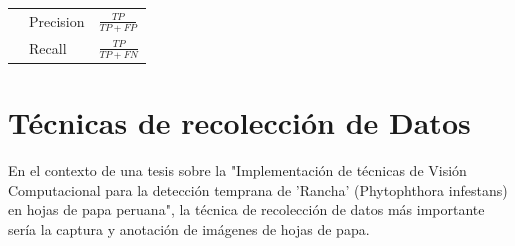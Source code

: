 \begin{table}[H]
\begin{tabular}{lll}
		\multicolumn{1}{|l|}{}                                                                                                                                                                                                                            & \multicolumn{1}{l|}{Precision}                                                                                 & \multicolumn{1}{l|}{\(\frac{TP}{TP + FP}\)}                                                                                       \\ \cline{2-3} 
		\multicolumn{1}{|l|}{}                                                                                                                                                                                                                            & \multicolumn{1}{l|}{\multirow{3}{*}{Recall}}                                                                   & \multicolumn{1}{l|}{\multirow{3}{*}{\(\frac{TP}{TP + FN}\)}}                                                                      \\
		\multicolumn{1}{|l|}{}                                                                                                                                                                                                                            & \multicolumn{1}{l|}{}                                                                                          & \multicolumn{1}{l|}{}                                                                                                             \\
		\multicolumn{1}{|l|}{}                                                                                                                                                                                                                            & \multicolumn{1}{l|}{}                                                                                          & \multicolumn{1}{l|}{}                                                                                                             \\ \hline
	\end{tabular}
\end{table}

\section{Técnicas de recolección de Datos}
En el contexto de una tesis sobre la "Implementación de técnicas de Visión Computacional para la detección temprana de 'Rancha' (Phytophthora infestans) en hojas de papa peruana", la técnica de recolección de datos más importante sería la captura y anotación de imágenes de hojas de papa. 

